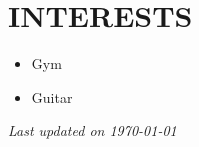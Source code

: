 \documentclass[11pt,a4paper]{moderncv}
\begin{document}
\begin{minipage}[t]{0.35\textwidth}
\section{INTERESTS}
\begin{itemize}
    \item Gym
    \item Guitar
\end{itemize}
\end{minipage}

\vspace*{\fill}
\begin{center}
\textit{Last updated on \today}
\end{center}
\vspace{-0.5cm}
\end{document}
